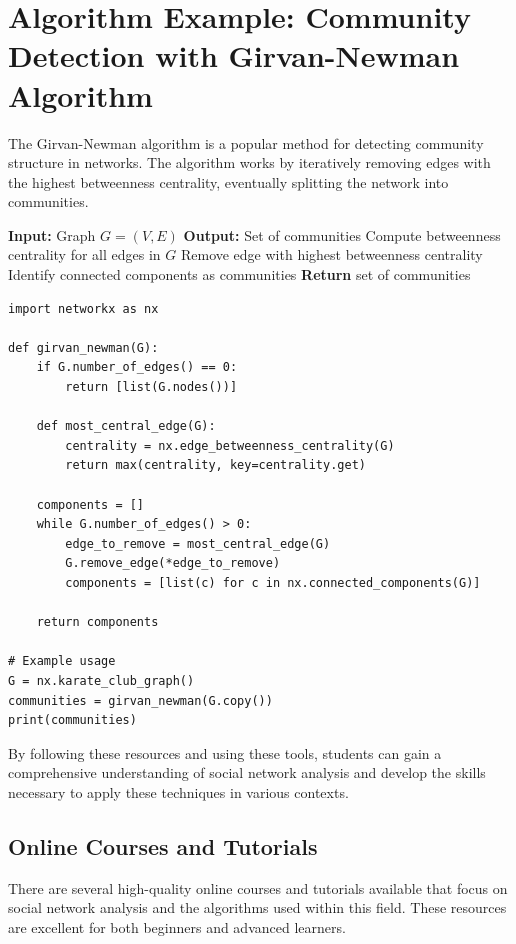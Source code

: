 \documentclass[12pt]{book} %
\begin{document}
\section*{Algorithm Example: Community Detection with Girvan-Newman Algorithm}
The Girvan-Newman algorithm is a popular method for detecting community structure in networks. The algorithm works by iteratively removing edges with the highest betweenness centrality, eventually splitting the network into communities.

\begin{algorithm}
\caption{Girvan-Newman Algorithm for Community Detection}
\begin{algorithmic}[1]
\State \textbf{Input:} Graph $G = (V, E)$
\State \textbf{Output:} Set of communities
    \State Compute betweenness centrality for all edges in $G$
    \State Remove edge with highest betweenness centrality
    \State Identify connected components as communities
\EndWhile
\State \textbf{Return} set of communities
\end{algorithmic}
\end{algorithm}

\FloatBarrier
\begin{lstlisting}
import networkx as nx

def girvan_newman(G):
    if G.number_of_edges() == 0:
        return [list(G.nodes())]
    
    def most_central_edge(G):
        centrality = nx.edge_betweenness_centrality(G)
        return max(centrality, key=centrality.get)
    
    components = []
    while G.number_of_edges() > 0:
        edge_to_remove = most_central_edge(G)
        G.remove_edge(*edge_to_remove)
        components = [list(c) for c in nx.connected_components(G)]
    
    return components

# Example usage
G = nx.karate_club_graph()
communities = girvan_newman(G.copy())
print(communities)
\end{lstlisting}
\FloatBarrier

By following these resources and using these tools, students can gain a comprehensive understanding of social network analysis and develop the skills necessary to apply these techniques in various contexts.

\subsection{Online Courses and Tutorials}
There are several high-quality online courses and tutorials available that focus on social network analysis and the algorithms used within this field. These resources are excellent for both beginners and advanced learners.
\end{document}
